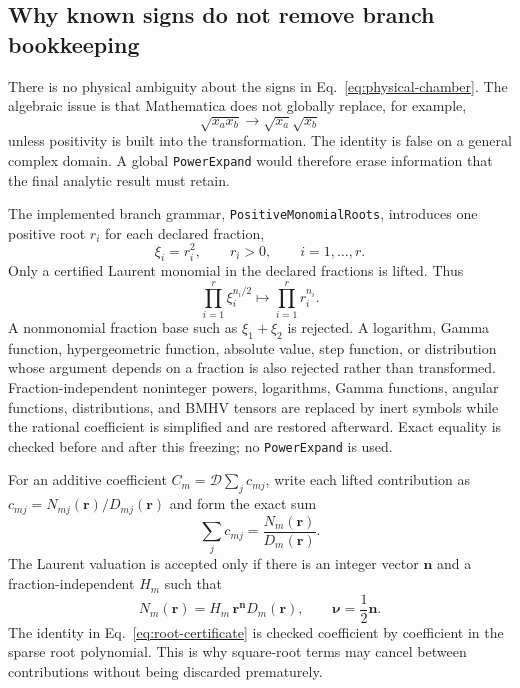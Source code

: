 \documentclass[11pt]{article}
\newcommand{\code}[1]{\texttt{#1}}
\begin{document}
\subsection{Why known signs do not remove branch bookkeeping}

There is no physical ambiguity about the signs in
Eq.~\eqref{eq:physical-chamber}.  The algebraic issue is that Mathematica does
not globally replace, for example,
\begin{equation}
  \sqrt{x_a x_b}\longrightarrow \sqrt{x_a}\sqrt{x_b}
\end{equation}
unless positivity is built into the transformation.  The identity is false
on a general complex domain.  A global \code{PowerExpand} would therefore
erase information that the final analytic result must retain.

The implemented branch grammar, \code{PositiveMonomialRoots}, introduces one
positive root $r_i$ for each declared fraction,
\begin{equation}
  \xi_i=r_i^2,\qquad r_i>0,\qquad i=1,\ldots,r.
  \label{eq:root-lift}
\end{equation}
Only a certified Laurent monomial in the declared fractions is lifted.  Thus
\begin{equation}
  \prod_{i=1}^{r}\xi_i^{n_i/2}
  \longmapsto \prod_{i=1}^{r}r_i^{n_i}.
\end{equation}
A nonmonomial fraction base such as $\xi_1+\xi_2$ is rejected.  A logarithm,
Gamma function, hypergeometric function, absolute value, step function, or
distribution whose argument depends on a fraction is also rejected rather
than transformed.  Fraction-independent noninteger powers, logarithms, Gamma
functions, angular functions, distributions, and BMHV tensors are replaced by
inert symbols while the rational coefficient is simplified and are restored
afterward.  Exact equality is checked before and after this freezing; no
\code{PowerExpand} is used.

For an additive coefficient $C_m=\mathcal D\sum_j c_{mj}$, write each lifted
contribution as $c_{mj}=N_{mj}(\boldsymbol r)/D_{mj}(\boldsymbol r)$ and form
the exact sum
\begin{equation}
  \sum_j c_{mj}=\frac{N_m(\boldsymbol r)}{D_m(\boldsymbol r)}.
\end{equation}
The Laurent valuation is accepted only if there is an integer vector
$\boldsymbol n$ and a fraction-independent $H_m$ such that
\begin{equation}
  N_m(\boldsymbol r)=
  H_m\,\boldsymbol r^{\boldsymbol n}D_m(\boldsymbol r),
  \qquad
  \boldsymbol\nu=\frac{1}{2}\boldsymbol n.
  \label{eq:root-certificate}
\end{equation}
The identity in Eq.~\eqref{eq:root-certificate} is checked coefficient by
coefficient in the sparse root polynomial.  This is why square-root terms may
cancel between contributions without being discarded prematurely.
\end{document}
